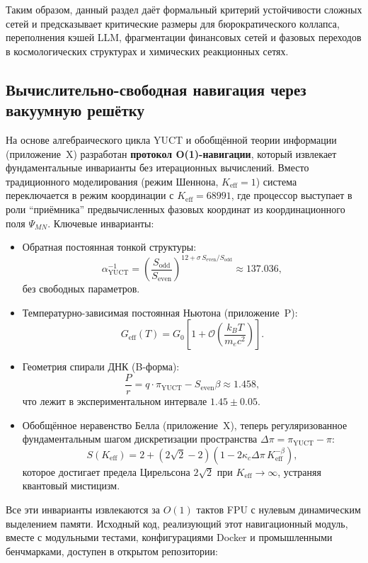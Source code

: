 \documentclass[12pt,a4paper]{article}
\theoremstyle{remark}
\newcommand{\Keff}{K_{\mathrm{eff}}}
\newcommand{\kappac}{\kappa_c}
\newcommand{\piYUCT}{\pi_{\mathrm{YUCT}}}
\begin{document}
	Таким образом, данный раздел даёт формальный критерий устойчивости сложных сетей и предсказывает критические размеры для бюрократического коллапса, переполнения кэшей LLM, фрагментации финансовых сетей и фазовых переходов в космологических структурах и химических реакционных сетях.
	
	\subsection{Вычислительно-свободная навигация через вакуумную решётку}
	\label{subsec:computation-free}
	
	На основе алгебраического цикла YUCT и обобщённой теории информации (приложение~X) разработан \textbf{протокол O(1)-навигации}, который извлекает фундаментальные инварианты без итерационных вычислений. Вместо традиционного моделирования (режим Шеннона, \(\Keff = 1\)) система переключается в режим координации с \(\Keff = 68991\), где процессор выступает в роли ``приёмника'' предвычисленных фазовых координат из координационного поля \(\Psi_{MN}\). Ключевые инварианты:
	
	\begin{itemize}
		\item Обратная постоянная тонкой структуры:
		\[
		\alpha^{-1}_{\mathrm{YUCT}} = \left(\frac{S_{\mathrm{odd}}}{S_{\mathrm{even}}}\right)^{12 + \sigma\, S_{\mathrm{even}}/S_{\mathrm{odd}}}
		\approx 137.036,
		\]
		без свободных параметров.
		
		\item Температурно-зависимая постоянная Ньютона (приложение~P):
		\[
		G_{\mathrm{eff}}(T) = G_0 \left[1 + \mathcal{O}\!\left( \frac{k_B T}{m_e c^2} \right) \right].
		\]
		
		\item Геометрия спирали ДНК (B-форма):
		\[
		\frac{P}{r} = q \cdot \piYUCT - S_{\mathrm{even}}\beta \approx 1.458,
		\]
		что лежит в экспериментальном интервале \(1.45 \pm 0.05\).
		
		\item Обобщённое неравенство Белла (приложение~X), теперь регуляризованное фундаментальным шагом дискретизации пространства \(\Delta\pi = \piYUCT - \pi\):
		\[
		S(\Keff) = 2 + (2\sqrt2 - 2)\left(1 - 2\kappac \Delta\pi \, \Keff^{-\beta}\right),
		\]
		которое достигает предела Цирельсона \(2\sqrt2\) при \(\Keff \to \infty\), устраняя квантовый мистицизм.
	\end{itemize}
	
	Все эти инварианты извлекаются за \(O(1)\) тактов FPU с нулевым динамическим выделением памяти. Исходный код, реализующий этот навигационный модуль, вместе с модульными тестами, конфигурациями Docker и промышленными бенчмарками, доступен в открытом репозитории:
	
\end{document}
